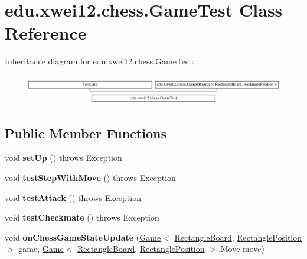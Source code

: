 \hypertarget{classedu_1_1xwei12_1_1chess_1_1_game_test}{}\section{edu.\+xwei12.\+chess.\+Game\+Test Class Reference}
\label{classedu_1_1xwei12_1_1chess_1_1_game_test}
Inheritance diagram for edu.\+xwei12.\+chess.\+Game\+Test\+:\begin{figure}[H]
\begin{center}
\leavevmode
\includegraphics[height=1.290323cm]{classedu_1_1xwei12_1_1chess_1_1_game_test}
\end{center}
\end{figure}
\subsection*{Public Member Functions}
\begin{DoxyCompactItemize}
\item 
void {\bfseries set\+Up} ()  throws Exception \hypertarget{classedu_1_1xwei12_1_1chess_1_1_game_test_ab0d4d454595aa60d955e1988ad0d1d1a}{}\label{classedu_1_1xwei12_1_1chess_1_1_game_test_ab0d4d454595aa60d955e1988ad0d1d1a}

\item 
void {\bfseries test\+Step\+With\+Move} ()  throws Exception \hypertarget{classedu_1_1xwei12_1_1chess_1_1_game_test_a5d432efdcea691918b25c1f33d929038}{}\label{classedu_1_1xwei12_1_1chess_1_1_game_test_a5d432efdcea691918b25c1f33d929038}

\item 
void {\bfseries test\+Attack} ()  throws Exception \hypertarget{classedu_1_1xwei12_1_1chess_1_1_game_test_ad4361ea048b412a67e9b5dbcd5024561}{}\label{classedu_1_1xwei12_1_1chess_1_1_game_test_ad4361ea048b412a67e9b5dbcd5024561}

\item 
void {\bfseries test\+Checkmate} ()  throws Exception \hypertarget{classedu_1_1xwei12_1_1chess_1_1_game_test_a0e0dff24bd8370a9d82073629668b689}{}\label{classedu_1_1xwei12_1_1chess_1_1_game_test_a0e0dff24bd8370a9d82073629668b689}

\item 
void {\bfseries on\+Chess\+Game\+State\+Update} (\hyperlink{classedu_1_1xwei12_1_1chess_1_1_game}{Game}$<$ \hyperlink{classedu_1_1xwei12_1_1chess_1_1_rectangle_board}{Rectangle\+Board}, \hyperlink{classedu_1_1xwei12_1_1chess_1_1_rectangle_position}{Rectangle\+Position} $>$ game, \hyperlink{classedu_1_1xwei12_1_1chess_1_1_game}{Game}$<$ \hyperlink{classedu_1_1xwei12_1_1chess_1_1_rectangle_board}{Rectangle\+Board}, \hyperlink{classedu_1_1xwei12_1_1chess_1_1_rectangle_position}{Rectangle\+Position} $>$.Move move)\hypertarget{classedu_1_1xwei12_1_1chess_1_1_game_test_add5cdac8ecad3faeb4631f09cd333bd9}{}\label{classedu_1_1xwei12_1_1chess_1_1_game_test_add5cdac8ecad3faeb4631f09cd333bd9}

\end{DoxyCompactItemize}


